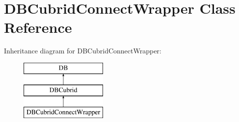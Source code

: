\hypertarget{classDBCubridConnectWrapper}{\section{D\+B\+Cubrid\+Connect\+Wrapper Class Reference}
\label{classDBCubridConnectWrapper}
}


 


Inheritance diagram for D\+B\+Cubrid\+Connect\+Wrapper\+:\begin{figure}[H]
\begin{center}
\leavevmode
\includegraphics[height=3.000000cm]{classDBCubridConnectWrapper}
\end{center}
\end{figure}
